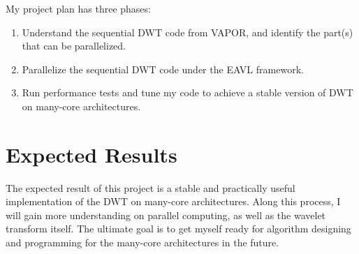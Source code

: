 \documentclass{article}
\begin{document}
My project plan has three phases:
\begin{enumerate}
\item Understand the sequential DWT code from VAPOR, 
and identify the part(s) that can be parallelized.
%
\item Parallelize the sequential DWT code under the EAVL framework.
%
\item Run performance tests and tune my code to achieve a stable version
of DWT on many-core architectures.
\end{enumerate}


\section{Expected Results}
%
The expected result of this project is a stable and practically useful 
implementation of the DWT on many-core architectures.
%
Along this process, I will gain more understanding on parallel
computing, as well as the wavelet transform itself.
%
The ultimate goal is to get myself ready for algorithm designing and 
programming for the many-core architectures in the future.







\end{document}
